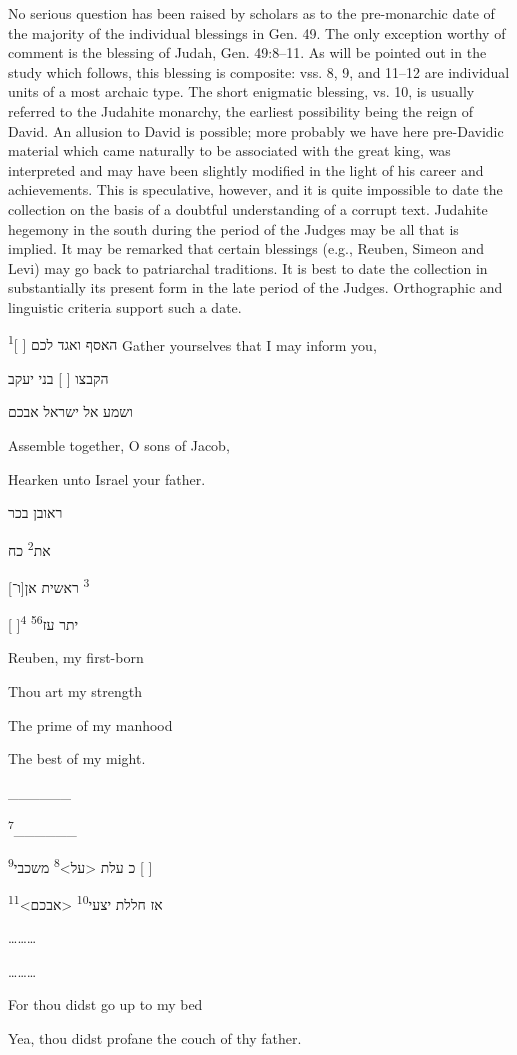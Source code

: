 {{        No serious question has been raised by scholars as to the pre-monarchic date of
        the majority of the individual blessings in Gen. 49. The only exception worthy
        of comment is the blessing of Judah, Gen. 49:8--11. As will be pointed out in
        the study which follows, this blessing is composite: vss. 8, 9, and 11--12 are
        individual units of a most archaic type. The short enigmatic blessing, vs. 10,
        is usually referred to the Judahite monarchy, the earliest possibility being
        the reign of David. An allusion to David is possible; more probably we have
        here pre-Davidic material which came naturally to be associated with the great
        king, was interpreted and may have been slightly modified in the light of his
        career and achievements. This is speculative, however, and it is quite
        impossible to date the collection on the basis of a doubtful understanding of
        a corrupt text. Judahite hegemony in the south during the period of the Judges
        may be all that is implied. It may be remarked that certain blessings (e.g.,
        Reuben, Simeon and Levi) may go back to patriarchal traditions. It is best to
        date the collection in substantially its present form in the late period of the
        Judges. Orthographic and linguistic criteria support such a date.
    }
}

{
	האסף ואגד לכם [ ]\textsuperscript{1}
}
{
	Gather yourselves that I may inform you,
}
{
}

{
	הקבצו [ ] בני יעקב

	ושמע אל ישראל אבכם
}
{
	Assemble together, O sons of Jacob,

	Hearken unto Israel your father.
}
{
}

{
	ראובן בכר

	את\textsuperscript{2} כח

	[ו־]\textsuperscript{3} ראשית אן

	[ ]\textsuperscript{4} יתר עז\textsuperscript{5}\textsuperscript{6}
}
{
	Reuben, my first-born

	Thou art my strength

	The prime of my manhood

	The best of my might.
}
{
}

{
	\_\_\_\_\_\_

	\textsuperscript{7}\_\_\_\_\_\_

	כ עלת <על>\textsuperscript{8} משכבי\textsuperscript{9} [ ]

	אז חללת יצעי\textsuperscript{10} <אבכם>\textsuperscript{11}
}
{
	\ldots\ldots\ldots

	\ldots\ldots\ldots

	For thou didst go up to my bed

	Yea, thou didst profane the couch
	of thy father.
}
{
}

